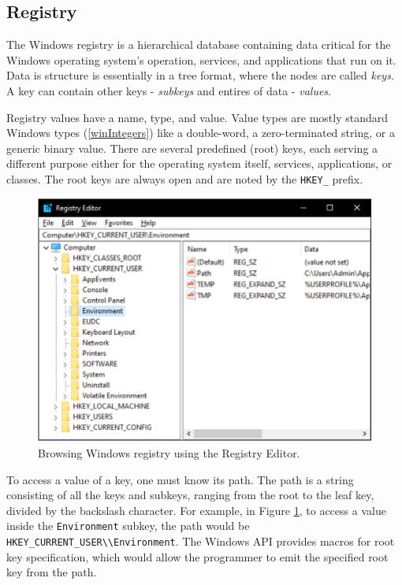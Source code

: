 \subsection*{Registry}
The Windows registry is a hierarchical database containing data critical for the Windows operating system's operation, services, and applications that run on it. Data is structure is essentially in a tree format, where the nodes are called \textit{keys}. A key can contain other keys - \textit{subkeys} and entires of data - \textit{values}. 

Registry values have a name, type, and value. Value types are mostly standard Windows types (\ref{winIntegers}) like a double-word, a zero-terminated string, or a generic binary value. There are several predefined (root) keys, each serving a different purpose either for the operating system itself, services, applications, or classes. The root keys are always open and are noted by the \lstinline{HKEY_} prefix.

\begin{figure}[htb!]
	\centering
	\includegraphics[]{obrazky-figures/regedit.pdf}
	\caption{Browsing Windows registry using the Registry Editor.}
	\label{winRegedit}
\end{figure}

To access a value of a key, one must know its path. The path is a string consisting of all the keys and subkeys, ranging from the root to the leaf key, divided by the backslash character.\cite{WinRegStruct}
For example, in Figure \ref{winRegedit}, to access a value inside the \lstinline{Environment} subkey, the path would be \lstinline{HKEY_CURRENT_USER\\Environment}. The Windows API provides macros for root key specification, which would allow the programmer to emit the specified root key from the path.

